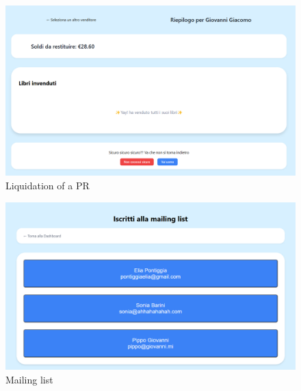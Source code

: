 \begin{figure}[ht]
    \centering
    \includegraphics[width=.75\textwidth]{assets/ui_mockup/liquidation.png}
    \caption{Liquidation of a PR}
    \label{fig:liquidation}
\end{figure}

\begin{figure}[ht]
    \centering
    \includegraphics[width=.75\textwidth]{assets/ui_mockup/mailinglist.png}
    \caption{Mailing list}
    \label{fig:mailinglist}
\end{figure}

